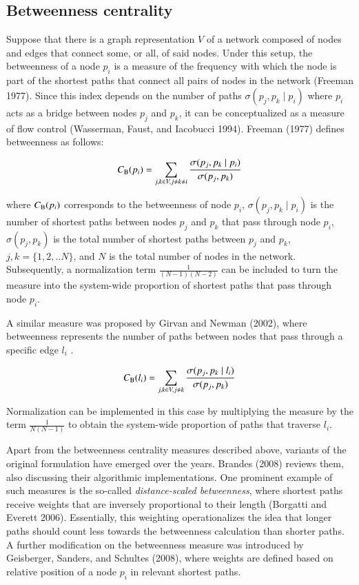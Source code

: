 \documentclass[]{elsarticle} %
\begin{document}
\subsection{Betweenness centrality}\label{betweenness-centrality}

Suppose that there is a graph representation \(V\) of a network composed
of nodes and edges that connect some, or all, of said nodes. Under this
setup, the betweenness of a node \(p_i\) is a measure of the frequency
with which the node is part of the shortest paths that connect all pairs
of nodes in the network (Freeman 1977). Since this index depends on the
number of paths \(\sigma(p_j,p_k \mid p_i)\) where \(p_i\) acts as a
bridge between nodes \(p_j\) and \(p_k\), it can be conceptualized as a
measure of flow control (Wasserman, Faust, and Iacobucci 1994). Freeman
(1977) defines betweenness as follows:

\begin{equation}\label{f:btw_node}
C_{\rm B}(p_i) =\sum_{j,k \space \in V,j\neq k {\neq i}} \frac{{\sigma(p_j,p_k \mid p_i)}}{\sigma(p_j,p_k)}
\end{equation}

\noindent where \(C_{\rm B}(p_i)\) corresponds to the betweenness of
node \(p_i\), \({\sigma(p_j,p_k \mid p_i)}\) is the number of shortest
paths between nodes \(p_j\) and \(p_k\) that pass through node \(p_i\),
\(\sigma(p_j,p_k)\) is the total number of shortest paths between
\(p_j\) and \(p_k\), \(j,k=\{1,2,..N\}\), and \(N\) is the total number
of nodes in the network. Subsequently, a normalization term
\(\frac{1}{(N-1)(N-2)}\) can be included to turn the measure into the
system-wide proportion of shortest paths that pass through node \(p_i\).

A similar measure was proposed by Girvan and Newman (2002), where
betweenness represents the number of paths between nodes that pass
through a specific edge \(l_i\) .

\begin{equation}\label{f:btw_link}
C_{\rm B}(l_i) =\sum\limits_{j,k \space \in V,j\neq k} \frac{{\sigma(p_j,p_k \mid l_i)}}{\sigma(p_j,p_k)}
\end{equation}

Normalization can be implemented in this case by multiplying the measure
by the term \(\frac{1}{N(N-1)}\) to obtain the system-wide proportion of
paths that traverse \(l_i\).

Apart from the betweenness centrality measures described above, variants
of the original formulation have emerged over the years. Brandes (2008)
reviews them, also discussing their algorithmic implementations. One
prominent example of such measures is the so-called
\textit{distance-scaled betweenness}, where shortest paths receive
weights that are inversely proportional to their length (Borgatti and
Everett 2006). Essentially, this weighting operationalizes the idea that
longer paths should count less towards the betweenness calculation than
shorter paths. A further modification on the betweenness measure was
introduced by Geisberger, Sanders, and Schultes (2008), where weights
are defined based on relative position of a node \(p_i\) in relevant
shortest paths.
\end{document}
